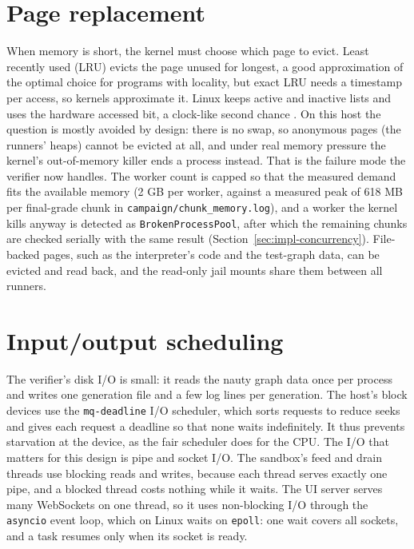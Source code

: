 \section{Page replacement}

When memory is short, the kernel must choose which page to evict. Least recently
used (LRU) evicts the page unused for longest, a good approximation of the
optimal choice for programs with locality, but exact LRU needs a timestamp per
access, so kernels approximate it. Linux keeps active and inactive lists and
uses the hardware accessed bit, a clock-like second chance
\citep{silberschatz2018os}. On this host the question is mostly avoided by
design: there is no swap, so anonymous pages (the runners' heaps) cannot be
evicted at all, and under real memory pressure the kernel's out-of-memory killer
ends a process instead. That is the failure mode the verifier now handles. The
worker count is capped so that the measured demand fits the available memory
(2 GB per worker, against a measured peak of 618 MB per final-grade chunk in
\texttt{campaign/chunk\_memory.log}), and a worker
the kernel kills anyway is detected as \texttt{BrokenProcessPool}, after which the
remaining chunks are checked serially with the same result
(Section~\ref{sec:impl-concurrency}). File-backed pages, such as the
interpreter's code and the test-graph data, can be evicted and read back, and
the read-only jail mounts share them between all runners.

\section{Input/output scheduling}

The verifier's disk I/O is small: it reads the nauty graph data once per process
and writes one generation file and a few log lines per generation. The host's
block devices use the \texttt{mq-deadline} I/O scheduler, which sorts requests to
reduce seeks and gives each request a deadline so that none waits indefinitely.
It thus prevents starvation at the device, as the fair scheduler does for the
CPU. The I/O that matters for this design is pipe and socket I/O. The sandbox's
feed and drain threads use blocking reads and writes, because each thread
serves exactly one pipe, and a blocked thread costs nothing while it waits. The
UI server serves many WebSockets on one thread, so it uses non-blocking I/O
through the \texttt{asyncio} event loop, which on Linux waits on
\texttt{epoll}: one wait covers all sockets, and a task resumes only when its
socket is ready.

